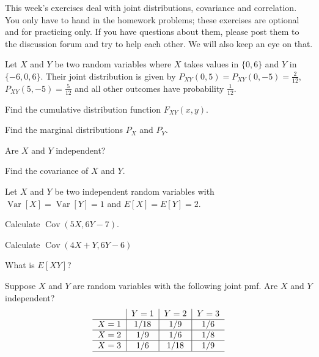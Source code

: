 \documentclass[a4paper,10pt,landscape,twocolumn]{scrartcl}
\DeclareMathOperator{\Cov}{Cov}
\DeclareMathOperator{\Var}{Var}
\begin{document}
\practiceproblems

{\sffamily\noindent
This week's exercises deal with joint distributions, covariance and correlation. You only have to hand in the homework problems; these exercises are optional and for practicing only. If you have questions about them, please post them to the discussion forum and try to help each other. We will also keep an eye on that.
}


\begin{exercise}[]
	Let $X$ and $Y$ be two random variables where $X$ takes values in $\{0, 6\}$ and $Y$ in $\{-6, 0, 6\}$. Their joint distribution is given by $P_{XY}(0,5) = P_{XY}(0, -5) = \frac{2}{12}$, $P_{XY}(5,-5) = \frac{5}{12}$ and all other outcomes have probability $\frac{1}{12}$. 
	
	\begin{subex}
	Find the cumulative distribution function $F_{XY}(x,y)$.	
	\end{subex}
		
	\begin{subex}
	Find the marginal distributions $P_X$ and $P_Y$.	
	\end{subex}
	
	\begin{subex}
	Are $X$ and $Y$ independent?	
	\end{subex}
	
	\begin{subex}
	Find the covariance of $X$ and $Y$.
	\end{subex}
\end{exercise}

\begin{exercise}[]
	Let $X$ and $Y$ be two independent random variables with $\Var[X] = \Var[Y] = 1$ and $E[X] = E[Y] = 2$.
	\begin{subex}
		Calculate $\Cov(5X,6Y - 7)$.
	\end{subex}
	\begin{subex}
		Calculate $\Cov(4X + Y, 6Y-6)$	
	\end{subex}
	
	\begin{subex}
		What is $E[XY]$?	
	\end{subex}
\end{exercise}

\begin{subex}
Suppose $X$ and $Y$ are random variables with the following joint pmf. Are $X$ and $Y$ independent?
	\[
	\begin{tabular}{c|c|c|c}
			&$Y=1$	&$Y=2$	&$Y=3$\\\hline
	$X=1$	&$1/18$	&$1/9$	&$1/6$ \\\hline
	$X=2$	&$1/9$	&$1/6$	&$1/8$ \\\hline
	$X=3$	&$1/6$	&$1/18$	&$1/9$  \\\hline
	\end{tabular}
	\]
\end{subex}
\end{document}
